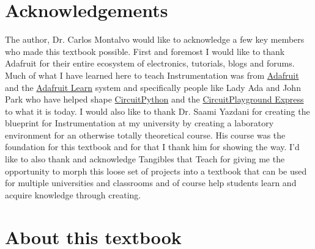 \newpage

\section*{Acknowledgements}

The author, Dr. Carlos Montalvo would like to acknowledge a few key
members who made this textbook possible. First and foremost I would
like to thank Adafruit for their entire ecosystem of electronics,
tutorials, blogs and forums. Much of what I have learned here to teach
Instrumentation was from \href{https://www.adafruit.com/}{Adafruit}
and the \href{https://learn.adafruit.com/}{Adafruit Learn} system and 
specifically people like Lady Ada and John Park who have helped shape
\href{https://circuitpython.org/}{CircuitPython} and the
\href{https://www.adafruit.com/product/3333}{CircuitPlayground
  Express} to what it is today. I 
would also like to thank Dr. Saami Yazdani for creating the blueprint
for Instrumentation at my university by creating a laboratory
environment for an otherwise totally theoretical course. His course
was the foundation for this textbook and for that I thank him for
showing the way. I’d like to also thank and acknowledge Tangibles that
Teach for giving me the opportunity to morph this loose set of
projects into a textbook that can be used for multiple universities
and classrooms and of course help students learn and acquire knowledge
through creating.

\section*{About this textbook}

